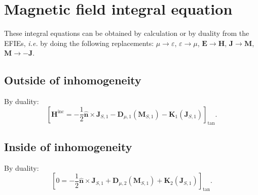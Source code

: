 \documentclass[a4paper,10pt]{book}
\newcommand{\field}[1]{\mathbf{#1}}
\newcommand{\current}[1]{\mathbf{#1}}
\newcommand{\vect}[1]{\mathbf{#1}}
\newcommand{\operator}[1]{\mathbf{#1}}
\begin{document}
\section{Magnetic field integral equation}
%
\par 
These integral equations can be obtained by calculation or by duality from the EFIEs, \textit{i.e.} by doing the following replacements: $\mu \rightarrow \varepsilon$, $\varepsilon \rightarrow \mu$, $\field{E} \rightarrow \field{H}$, $\current{J} \rightarrow \current{M}$, $\current{M} \rightarrow -\current{J}$.

\subsection{Outside of inhomogeneity}
%
\par
By duality:
\begin{equation}
\boxed{
\left[\field{H}^\text{inc} =  -\frac{1}{2}\vect{\hat{n}}\times \current{J}_{S,1} - \operator{D}_{\mu, 1}\left(\current{M}_{S,1}\right) - \operator{K}_{1}\left(\current{J}_{S,1}\right) \right]_\text{tan} }.
\end{equation}

\subsection{Inside of inhomogeneity}
%
\par
By duality:
\begin{equation}
\boxed{
\left[ 0 =  -\frac{1}{2}\vect{\hat{n}}\times \current{J}_{S,1} + \operator{D}_{\mu, 2}\left(\current{M}_{S,1}\right) + \operator{K}_{2}\left(\current{J}_{S,1}\right) \right]_\text{tan} }.
\end{equation}
\end{document}
